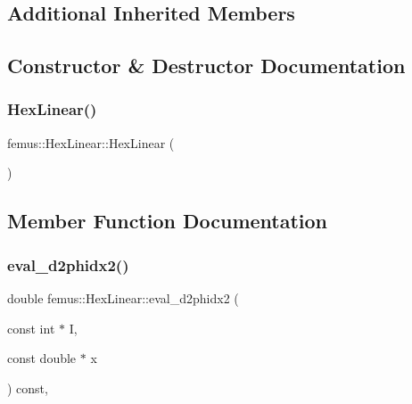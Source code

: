 \subsection*{Additional Inherited Members}


\subsection{Constructor \& Destructor Documentation}
\mbox{\label{classfemus_1_1_hex_linear_a98a491b9c49bfb16056b1ef57e91d4a3}} 
\subsubsection{\texorpdfstring{Hex\+Linear()}{HexLinear()}}
{\footnotesize\ttfamily femus\+::\+Hex\+Linear\+::\+Hex\+Linear (\begin{DoxyParamCaption}{ }\end{DoxyParamCaption})\hspace{0.3cm}{\ttfamily [inline]}}



\subsection{Member Function Documentation}
\mbox{\label{classfemus_1_1_hex_linear_a76ae681b7882ed7ea9683dee6aabc5aa}} 
\subsubsection{\texorpdfstring{eval\+\_\+d2phidx2()}{eval\_d2phidx2()}}
{\footnotesize\ttfamily double femus\+::\+Hex\+Linear\+::eval\+\_\+d2phidx2 (\begin{DoxyParamCaption}\item[{const int $\ast$}]{I,  }\item[{const double $\ast$}]{x }\end{DoxyParamCaption}) const\hspace{0.3cm}{\ttfamily [inline]}, {\ttfamily [virtual]}}



